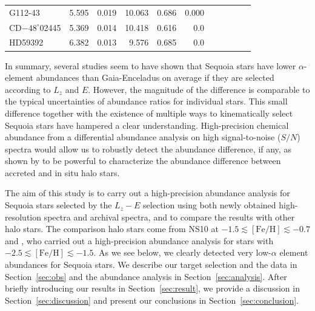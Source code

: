 \documentclass{aa}
\begin{document}
\begin{table}
\begin{tabular}{lrrrrrrrrrr}
G112-43         &      5.595 &      0.019 & 10.063 &  0.686 &  0.000 &        &            &            &            &            \\
CD$-48^{\circ}$02445      &      5.369 &      0.014 & 10.418 &  0.616 &    0.0 &        &            &            &            &            \\
HD59392         &      6.382 &      0.013 &  9.576 &  0.685 &    0.0 &        &            &            &            &            \\
\hline
  \end{tabular}
\end{table}

In summary, several studies seem to have shown that Sequoia stars have lower $\alpha$-element abundances than Gaia-Enceladus on average if they are selected according to $L_z$ and $E$.
However, the magnitude of the difference is comparable to the typical uncertainties of abundance ratios for individual stars. 
This small difference together with the existence of multiple ways to kinematically select Sequoia stars have hampered a clear understanding.
High-precision chemical abundance from a differential abundance analysis on high signal-to-noise ($S/N$) spectra would allow us to robustly detect the abundance difference, if any, as shown by \citet{Nissen2010,Nissen2011} to be powerful to characterize the abundance difference between accreted and in situ halo stars.

The aim of this study is to carry out a high-precision abundance analysis for Sequoia stars selected by the $L_z-E$ selection using both newly obtained high-resolution spectra and archival spectra, and to compare the results with other halo stars.
The comparison halo stars come from NS10 at $-1.5\lesssim [\mathrm{Fe/H}]\lesssim -0.7$ and \citet[][R17]{Reggiani2017a}, who carried out a high-precision abundance analysis for stars with $-2.5\lesssim[\mathrm{Fe/H}]\lesssim-1.5$. 
As we see below, we clearly detected very low-$\alpha$ element abundances for Sequoia stars.
We describe our target selection and the data in Section~\ref{sec:obs} and the abundance analysis in Section~\ref{sec:analysis}.
After briefly introducing our results in Section~\ref{sec:result}, we provide a discussion in Section~\ref{sec:discussion} and present our conclusions in Section~\ref{sec:conclusion}. 
\end{document}

